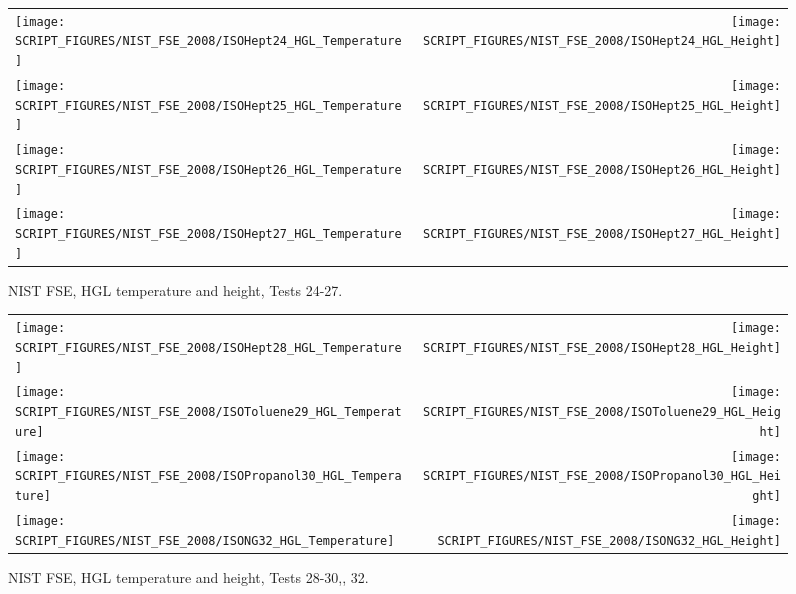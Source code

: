\begin{figure}[p]
\begin{tabular*}{\textwidth}{l@{\extracolsep{\fill}}r}
\texttt{[image: SCRIPT\_FIGURES/NIST\_FSE\_2008/ISOHept24\_HGL\_Temperature]} &
\texttt{[image: SCRIPT\_FIGURES/NIST\_FSE\_2008/ISOHept24\_HGL\_Height]} \\
\texttt{[image: SCRIPT\_FIGURES/NIST\_FSE\_2008/ISOHept25\_HGL\_Temperature]} &
\texttt{[image: SCRIPT\_FIGURES/NIST\_FSE\_2008/ISOHept25\_HGL\_Height]} \\
\texttt{[image: SCRIPT\_FIGURES/NIST\_FSE\_2008/ISOHept26\_HGL\_Temperature]} &
\texttt{[image: SCRIPT\_FIGURES/NIST\_FSE\_2008/ISOHept26\_HGL\_Height]} \\
\texttt{[image: SCRIPT\_FIGURES/NIST\_FSE\_2008/ISOHept27\_HGL\_Temperature]} &
\texttt{[image: SCRIPT\_FIGURES/NIST\_FSE\_2008/ISOHept27\_HGL\_Height]}
\end{tabular*}
\caption[NIST FSE, HGL temperature and height, Tests 24-27]
{NIST FSE, HGL temperature and height, Tests 24-27.}
\label{NIST_FSE_2008_HGL_Temp_5}
\end{figure}

\begin{figure}[p]
\begin{tabular*}{\textwidth}{l@{\extracolsep{\fill}}r}
\texttt{[image: SCRIPT\_FIGURES/NIST\_FSE\_2008/ISOHept28\_HGL\_Temperature]} &
\texttt{[image: SCRIPT\_FIGURES/NIST\_FSE\_2008/ISOHept28\_HGL\_Height]} \\
\texttt{[image: SCRIPT\_FIGURES/NIST\_FSE\_2008/ISOToluene29\_HGL\_Temperature]} &
\texttt{[image: SCRIPT\_FIGURES/NIST\_FSE\_2008/ISOToluene29\_HGL\_Height]} \\
\texttt{[image: SCRIPT\_FIGURES/NIST\_FSE\_2008/ISOPropanol30\_HGL\_Temperature]} &
\texttt{[image: SCRIPT\_FIGURES/NIST\_FSE\_2008/ISOPropanol30\_HGL\_Height]} \\
\texttt{[image: SCRIPT\_FIGURES/NIST\_FSE\_2008/ISONG32\_HGL\_Temperature]} &
\texttt{[image: SCRIPT\_FIGURES/NIST\_FSE\_2008/ISONG32\_HGL\_Height]}
\end{tabular*}
\caption[NIST FSE, HGL temperature and height, Tests 28-30, 32]
{NIST FSE, HGL temperature and height, Tests 28-30,, 32.}
\label{NIST_FSE_2008_HGL_Temp_6}
\end{figure}


\clearpage

